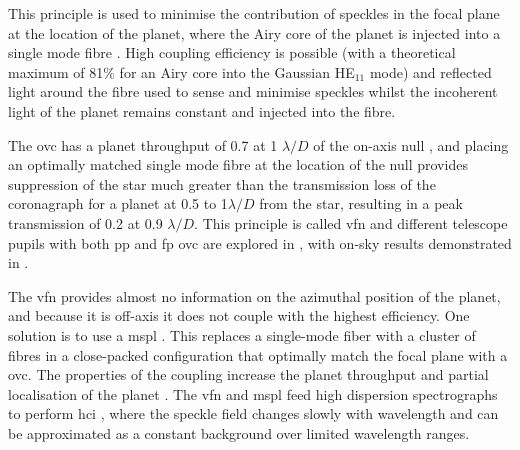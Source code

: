 \documentclass[letterpaper]{ar-1col}
\newcommand{\ld}{$\lambda/D$}
\begin{document}
This principle is used to minimise the contribution of speckles in the focal plane at the location of the planet, where the Airy core of the planet is injected into a single mode fibre \citep{Mawet17}.
%
High coupling efficiency is possible (with a theoretical maximum of 81\% for an Airy core into the Gaussian HE$_{11}$ mode) and reflected light around the fibre used to sense and minimise speckles whilst the incoherent light of the planet remains constant and injected into the fibre.

The \ac{ovc} has a planet throughput of 0.7 at 1 \ld{} of the on-axis null \citep{Mawet05b}, and placing an optimally matched single mode fibre at the location of the null provides suppression of the star much greater than the transmission loss of the coronagraph for a planet at 0.5 to 1\ld{} from the star, resulting in a peak transmission of 0.2 at 0.9 \ld{}.
%
This principle is called \acl{vfn} \citep[\acs{vfn}; ][]{Ruane18} and different telescope pupils with both \ac{pp} and \ac{fp} \ac{ovc} are explored in \citet{Ruane19}, with on-sky results demonstrated in \citet{Echeverri24}.

The \ac{vfn} provides almost no information on the azimuthal position of the planet, and because it is off-axis it does not couple with the highest efficiency.
%
One solution is to use a \acl{mspl} \citep[\acs{mspl}; ][]{LeonSaval13}.
%
This replaces a single-mode fiber with a cluster of fibres in a close-packed configuration that optimally match the focal plane with a \ac{ovc}.
%
The properties of the coupling increase the planet throughput and partial localisation of the planet \citep{Xin22}.
%
The \ac{vfn} and \ac{mspl} feed high dispersion spectrographs to perform \ac{hci} \citep[][ and this Review]{Snellen15}, where the speckle field changes slowly with wavelength and can be approximated as a constant background over limited wavelength ranges.
\end{document}

